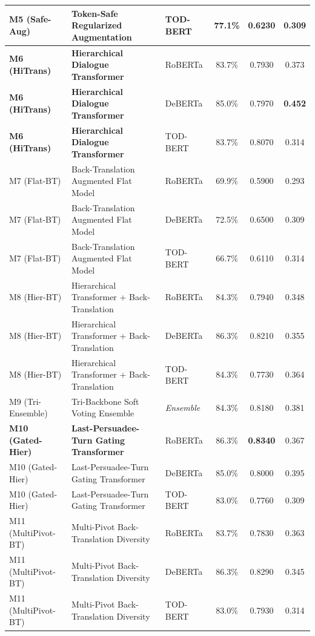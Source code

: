 \begin{table}[p]
\begin{tabularx}{\textwidth}{l>{\raggedright\arraybackslash}Xlccc}
    M5 (Safe-Aug) & Token-Safe Regularized Augmentation & TOD-BERT & 77.1\% & 0.6230 & 0.309 \\
    \midrule
    \rowcolor{lightbg}
    \textbf{M6 (HiTrans)} & \textbf{Hierarchical Dialogue Transformer} & RoBERTa & 83.7\% & 0.7930 & 0.373 \\
    \textbf{M6 (HiTrans)} & \textbf{Hierarchical Dialogue Transformer} & DeBERTa & 85.0\% & 0.7970 & \textbf{0.452} \\
    \rowcolor{lightbg}
    \textbf{M6 (HiTrans)} & \textbf{Hierarchical Dialogue Transformer} & TOD-BERT & 83.7\% & 0.8070 & 0.314 \\
    \midrule
    M7 (Flat-BT) & Back-Translation Augmented Flat Model & RoBERTa & 69.9\% & 0.5900 & 0.293 \\
    \rowcolor{lightbg}
    M7 (Flat-BT) & Back-Translation Augmented Flat Model & DeBERTa & 72.5\% & 0.6500 & 0.309 \\
    M7 (Flat-BT) & Back-Translation Augmented Flat Model & TOD-BERT & 66.7\% & 0.6110 & 0.314 \\
    \midrule
    \rowcolor{lightbg}
    M8 (Hier-BT) & Hierarchical Transformer + Back-Translation & RoBERTa & 84.3\% & 0.7940 & 0.348 \\
    M8 (Hier-BT) & Hierarchical Transformer + Back-Translation & DeBERTa & 86.3\% & 0.8210 & 0.355 \\
    \rowcolor{lightbg}
    M8 (Hier-BT) & Hierarchical Transformer + Back-Translation & TOD-BERT & 84.3\% & 0.7730 & 0.364 \\
    \midrule
    M9 (Tri-Ensemble) & Tri-Backbone Soft Voting Ensemble & \textit{Ensemble} & 84.3\% & 0.8180 & 0.381 \\
    \midrule
    \rowcolor{lightbg}
    \textbf{M10 (Gated-Hier)} & \textbf{Last-Persuadee-Turn Gating Transformer} & RoBERTa & 86.3\% & \textbf{0.8340} & 0.367 \\
    M10 (Gated-Hier) & Last-Persuadee-Turn Gating Transformer & DeBERTa & 85.0\% & 0.8000 & 0.395 \\
    \rowcolor{lightbg}
    M10 (Gated-Hier) & Last-Persuadee-Turn Gating Transformer & TOD-BERT & 83.0\% & 0.7760 & 0.309 \\
    \midrule
    M11 (MultiPivot-BT) & Multi-Pivot Back-Translation Diversity & RoBERTa & 83.7\% & 0.7830 & 0.363 \\
    \rowcolor{lightbg}
    M11 (MultiPivot-BT) & Multi-Pivot Back-Translation Diversity & DeBERTa & 86.3\% & 0.8290 & 0.345 \\
    M11 (MultiPivot-BT) & Multi-Pivot Back-Translation Diversity & TOD-BERT & 83.0\% & 0.7930 & 0.314 \\

\end{tabularx}
\end{table}

